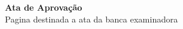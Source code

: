 \begin{titlepage}
    \thispagestyle{empty}
    \vspace*{5cm}
    \begin{center}
        \textbf{Ata de Aprova\c{c}\~{a}o}\\[10mm]
        Pagina destinada a ata da banca examinadora
    \end{center}
\end{titlepage}
\clearpage
